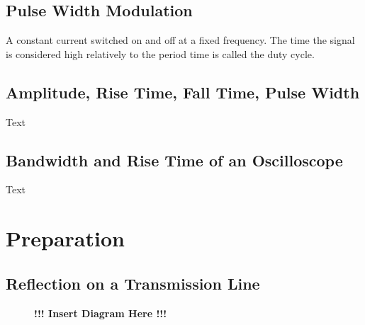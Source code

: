     \subsection*{Pulse Width Modulation}
    A constant current switched on and off at a fixed frequency. The time the signal is considered high relatively to the
    period time is called the duty cycle.
    \subsection*{Amplitude, Rise Time, Fall Time, Pulse Width}
    Text
    \subsection*{Bandwidth and Rise Time of an Oscilloscope}
    Text
\section{Preparation}
%
    \subsection*{Reflection on a Transmission Line}
    \begin{figure}[h]
        \centering
        \begin{framed}
            \textbf{!!! Insert Diagram Here !!!}
        \end{framed}
    \end{figure}
